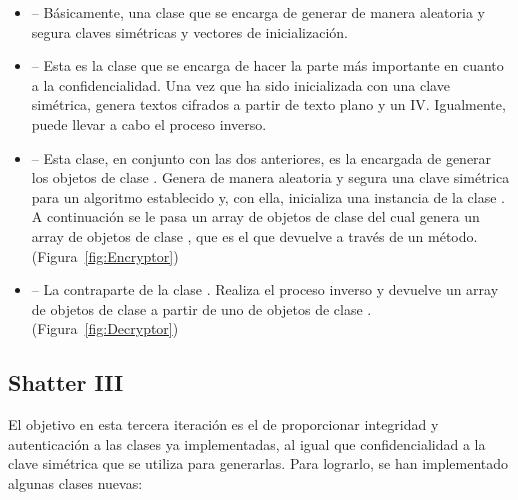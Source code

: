 \begin{itemize}
  \item {} -- Básicamente, una clase que se encarga de generar de manera aleatoria y segura claves simétricas y vectores de inicialización.

  \item {} -- Esta es la clase que se encarga de hacer la parte más importante en cuanto a la confidencialidad. Una vez que ha sido inicializada con una clave simétrica, genera textos cifrados a partir de texto plano y un IV. Igualmente, puede llevar a cabo el proceso inverso.

  \item {} -- Esta clase, en conjunto con las dos anteriores, es la encargada de generar los objetos de clase . Genera de manera aleatoria y segura una clave simétrica para un algoritmo establecido y, con ella, inicializa una instancia de la clase . A continuación se le pasa un array de objetos de clase  del cual genera un array de objetos de clase , que es el que devuelve a través de un método. (Figura~\ref{fig:Encryptor})

  \item {} -- La contraparte de la clase . Realiza el proceso inverso y devuelve un array de objetos de clase  a partir de uno de objetos de clase . (Figura~\ref{fig:Decryptor})
\end{itemize}

\subsection{Shatter III}

El objetivo en esta tercera iteración es el de proporcionar integridad y autenticación a las clases ya implementadas, al igual que confidencialidad a la clave simétrica que se utiliza para generarlas. Para lograrlo, se han implementado algunas clases nuevas:

